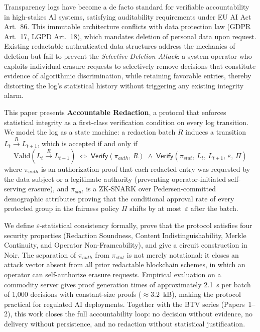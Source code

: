 Transparency logs have become a de facto standard for verifiable accountability
in high-stakes AI systems, satisfying auditability requirements under EU AI
Act Art.~86. This immutable architecture conflicts with data protection law
(GDPR Art.~17, LGPD Art.~18), which mandates deletion of personal data upon
request. Existing redactable authenticated data structures address the
mechanics of deletion but fail to prevent the \emph{Selective Deletion Attack}:
a system operator who exploits individual erasure requests to selectively remove
decisions that constitute evidence of algorithmic discrimination, while retaining
favorable entries, thereby distorting the log's statistical history without
triggering any existing integrity alarm.

This paper presents \textbf{Accountable Redaction}, a protocol that enforces
statistical integrity as a first-class verification condition on every log
transition. We model the log as a state machine: a redaction batch $R$
induces a transition $L_t \xrightarrow{R} L_{t+1}$, which is accepted if and
only if
\[
  \text{Valid}\!\left(L_t \xrightarrow{R} L_{t+1}\right) \;\iff\;
  \mathsf{Verify}(\pi_{\mathit{auth}},\, R)
  \;\land\;
  \mathsf{Verify}(\pi_{\mathit{stat}},\, L_t,\, L_{t+1},\, \varepsilon,\, \Pi)
\]
where $\pi_{\mathit{auth}}$ is an authorization proof that each redacted entry
was requested by the data subject or a legitimate authority (preventing
operator-initiated self-serving erasure), and $\pi_{\mathit{stat}}$ is a
ZK-SNARK over Pedersen-committed demographic attributes proving that the
conditional approval rate of every protected group in the fairness policy $\Pi$
shifts by at most~$\varepsilon$ after the batch.

We define $\varepsilon$-statistical consistency formally, prove that the
protocol satisfies four security properties (Redaction Soundness, Content
Indistinguishability, Merkle Continuity, and Operator Non-Frameability), and
give a circuit construction in Noir. The separation of $\pi_{\mathit{auth}}$
from $\pi_{\mathit{stat}}$ is not merely notational: it closes an attack vector
absent from all prior redactable blockchain schemes, in which an operator can
self-authorize erasure requests. Empirical evaluation on a commodity server
gives proof generation times of approximately 2.1~s per batch of 1{,}000
decisions with constant-size proofs ($\approx$3.2~kB), making the protocol
practical for regulated AI deployments. Together with the BTV series
(Papers~1--2), this work closes the full accountability loop: no decision
without evidence, no delivery without persistence, and no redaction without
statistical justification.
